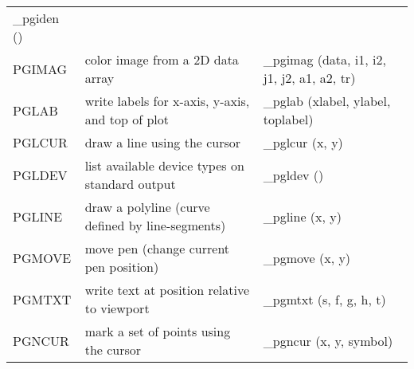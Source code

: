 \documentclass{book}
\begin{document}
{\begin{center}
\begin{tabular}{|l|p{2.5in}|p{2.25in}|}
\_pgiden () \\
PGIMAG & color image from a 2D data array                                     &
\_pgimag (data, i1, i2, j1, j2, a1, a2, tr) \\
PGLAB & write labels for x-axis, y-axis, and top of plot                &
\_pglab (xlabel, ylabel, toplabel) \\
PGLCUR & draw a line using the cursor               &
\_pglcur (x, y) \\
PGLDEV & list available device types on standard output                 &
\_pgldev () \\
PGLINE & draw a polyline (curve defined by line-segments)               &
\_pgline (x, y) \\
PGMOVE & move pen (change current pen position)                         &
\_pgmove (x, y) \\
PGMTXT & write text at position relative to viewport                    &
\_pgmtxt (s, f, g, h, t) \\
PGNCUR & mark a set of points using the cursor               &
\_pgncur (x, y, symbol) \\
\hline
\end{tabular}


\end{center}}
\end{document}
